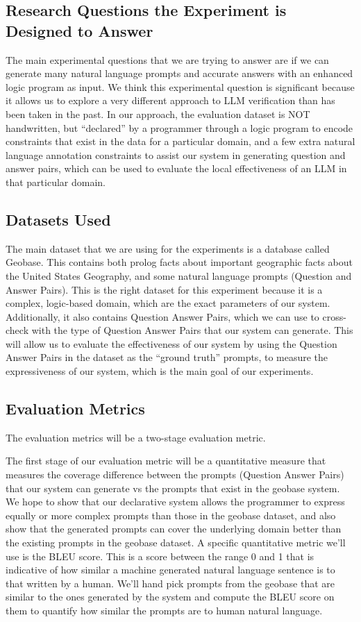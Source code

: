 \documentclass{article}
\begin{document}
\subsection{Research Questions the Experiment is Designed to Answer}
The main experimental questions that we are trying to answer are if we can generate many natural language prompts and accurate answers with an enhanced logic program as input. We think this experimental question is significant because it allows us to explore a very different approach to LLM verification than has been taken in the past. In our approach, the evaluation dataset is NOT handwritten, but “declared” by a programmer through a logic program to encode constraints that exist in the data for a particular domain, and a few extra natural language annotation constraints to assist our system in generating question and answer pairs, which can be used to evaluate the local effectiveness of an LLM in that particular domain.

\subsection{Datasets Used}
The main dataset that we are using for the experiments is a database called Geobase. This contains both prolog facts about important geographic facts about the United States Geography, and some natural language prompts (Question and Answer Pairs). This is the right dataset for this experiment because it is a complex, logic-based domain, which are the exact parameters of our system. Additionally, it also contains Question Answer Pairs, which we can use to cross-check with the type of Question Answer Pairs that our system can generate. This will allow us to evaluate the effectiveness of our system by using the Question Answer Pairs in the dataset as the “ground truth” prompts, to measure the expressiveness of our system, which is the main goal of our experiments.

\subsection{Evaluation Metrics}


The evaluation metrics will be a two-stage evaluation metric. 


The first stage of our evaluation metric will be a quantitative measure that measures the coverage difference between the prompts (Question Answer Pairs) that our system can generate vs the prompts that exist in the geobase system.  We hope to show that our declarative system allows the programmer to express equally or more complex prompts than those in the geobase dataset, and also show that the generated prompts can cover the underlying domain better than the existing prompts in the geobase dataset. A specific quantitative metric we’ll use is the BLEU score.  This is a score between the range 0 and 1 that is indicative of how similar a machine generated natural language sentence is to that written by a human.  We’ll hand pick prompts from the geobase that are similar to the ones generated by the system and compute the BLEU score on them to quantify how similar the prompts are to human natural language.
\end{document}
